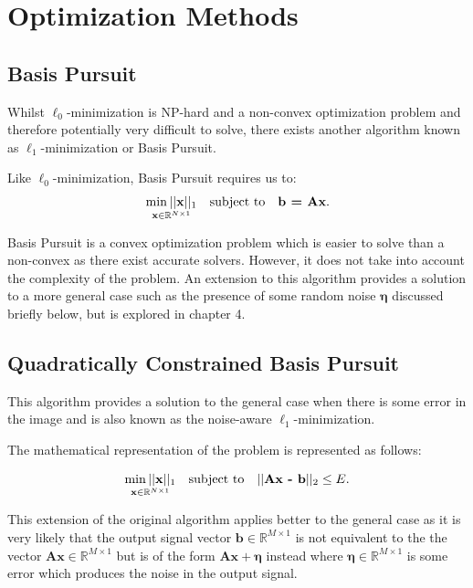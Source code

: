 \documentclass[titlepage,oneside, 12pt]{book}
\theoremstyle{break}
\begin{document}
\section{Optimization Methods}

\subsection{Basis Pursuit}
Whilst $\ell_0$-minimization is NP-hard and a non-convex optimization problem and therefore potentially very difficult to solve, there exists another algorithm known as $\ell_1$-minimization or Basis Pursuit.

Like $\ell_0$-minimization, Basis Pursuit requires us to:
\begin{equation}
\begin{gathered}
\underset{\textbf{x} \in \mathbb{R}^{N \times 1}}{\min ||\textbf{x}||_{1}} \quad \space \text{subject to} \quad \textbf{b = Ax}.
\end{gathered}
\end{equation}

Basis Pursuit is a convex optimization problem which is easier to solve than a non-convex as there exist accurate solvers. However, it does not take into account the complexity of the problem. An extension to this algorithm provides a solution to a more general case such as the presence of some random noise $\pmb{\eta}$ discussed briefly below, but is explored in chapter 4. 


\subsection{Quadratically Constrained Basis Pursuit}
This algorithm provides a solution to the general case when there is some error in the image and is also known as the noise-aware $\ell_1$-minimization. 

The mathematical representation of the problem is represented as follows: 

\begin{equation}
\begin{gathered}
\underset{\textbf{x} \in \mathbb{R}^{N \times 1}}{\min ||\textbf{x}||_{1}} \quad \space \text{subject to} \quad ||\textbf{Ax - b}||_{2} \le E.
\end{gathered}
\end{equation}

This extension of the original algorithm applies better to the general case as it is very likely that the output signal vector $\textbf{b} \in \mathbb{R}^{M \times 1}$ is not equivalent to the the vector $\textbf{Ax} \in \mathbb{R}^{M \times 1}$ but is of the form $\textbf{Ax} + \pmb{\eta}$ instead where $\pmb{\eta} \in \mathbb{R}^{M \times 1}$ is some error which produces the noise in the output signal.
\end{document}

